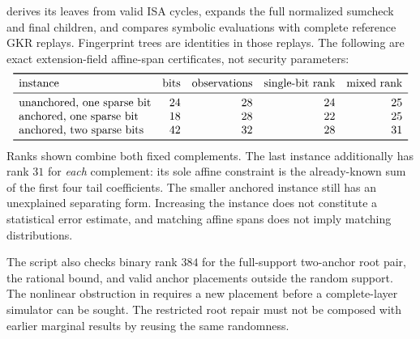  derives its leaves from valid ISA cycles, expands the full normalized sumcheck and final children, and compares symbolic evaluations with complete reference GKR replays. Fingerprint trees are identities in those replays. The following are exact extension-field affine-span certificates, not security parameters:
\[
\begin{array}{lrrrr}
\toprule
\text{instance}&\text{bits}&\text{observations}&\text{single-bit rank}&\text{mixed rank}\\
\midrule
\text{unanchored, one sparse bit}&24&28&24&25\\
\text{anchored, one sparse bit}&18&28&22&25\\
\text{anchored, two sparse bits}&42&32&28&31\\
\bottomrule
\end{array}
\]
Ranks shown combine both fixed complements. The last instance additionally has rank $31$ for \emph{each} complement: its sole affine constraint is the already-known sum of the first four tail coefficients. The smaller anchored instance still has an unexplained separating form. Increasing the instance does not constitute a statistical error estimate, and matching affine spans does not imply matching distributions.

The script also checks binary rank $384$ for the full-support two-anchor root pair, the rational bound, and valid anchor placements outside the random support. The nonlinear obstruction in  requires a new placement before a complete-layer simulator can be sought. The restricted root repair must not be composed with earlier marginal results by reusing the same randomness.
